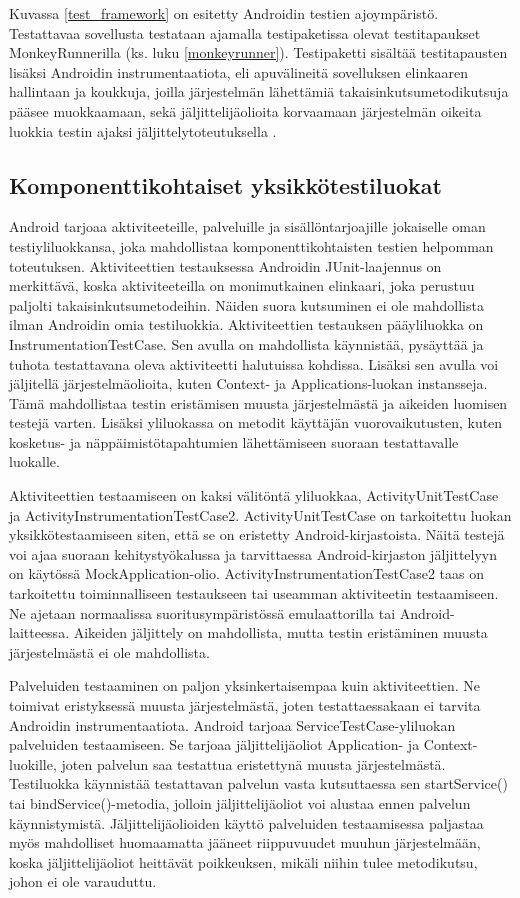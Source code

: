 Kuvassa \ref{test_framework} on esitetty Androidin testien ajoympäristö. Testattavaa sovellusta testataan ajamalla testipaketissa olevat testitapaukset MonkeyRunnerilla (ks. luku \ref{monkeyrunner}). Testipaketti sisältää testitapausten lisäksi Androidin instrumentaatiota, eli apuvälineitä sovelluksen elinkaaren hallintaan ja koukkuja, joilla järjestelmän lähettämiä takaisinkutsumetodikutsuja pääsee muokkaamaan, sekä jäljittelijäolioita korvaamaan järjestelmän oikeita luokkia testin ajaksi jäljittelytoteutuksella \cite{android}.

\subsection{Komponenttikohtaiset yksikkötestiluokat}

Android tarjoaa aktiviteeteille, palveluille ja sisällöntarjoajille jokaiselle oman testiyliluokkansa, joka mahdollistaa komponenttikohtaisten testien helpomman toteutuksen. Aktiviteettien testauksessa Androidin JUnit-laajennus on merkittävä, koska aktiviteeteilla on monimutkainen elinkaari, joka perustuu paljolti takaisinkutsumetodeihin. Näiden suora kutsuminen ei ole mahdollista ilman Androidin omia testiluokkia. Aktiviteettien testauksen pääyliluokka on InstrumentationTestCase. Sen avulla on mahdollista käynnistää, pysäyttää ja tuhota testattavana oleva aktiviteetti halutuissa kohdissa. Lisäksi sen avulla voi jäljitellä järjestelmäolioita, kuten Context- ja Applications-luokan instansseja. Tämä mahdollistaa testin eristämisen muusta järjestelmästä ja aikeiden luomisen testejä varten. Lisäksi yliluokassa on metodit käyttäjän vuorovaikutusten, kuten kosketus- ja näppäimistötapahtumien lähettämiseen suoraan testattavalle luokalle.

Aktiviteettien testaamiseen on kaksi välitöntä yliluokkaa, ActivityUnitTestCase ja ActivityInstrumentationTestCase2. ActivityUnitTestCase on tarkoitettu luokan yksikkötestaamiseen siten, että se on eristetty Android-kirjastoista. Näitä testejä voi ajaa suoraan kehitystyökalussa ja tarvittaessa Android-kirjaston jäljittelyyn on käytössä MockApplication-olio. ActivityInstrumentationTestCase2 taas on tarkoitettu toiminnalliseen testaukseen tai useamman aktiviteetin testaamiseen. Ne ajetaan normaalissa suoritusympäristössä emulaattorilla tai Android-laitteessa. Aikeiden jäljittely on mahdollista, mutta testin eristäminen muusta järjestelmästä ei ole mahdollista.

Palveluiden testaaminen on paljon yksinkertaisempaa kuin aktiviteettien. Ne toimivat eristyksessä muusta järjestelmästä, joten testattaessakaan ei tarvita Androidin instrumentaatiota. Android tarjoaa ServiceTestCase-yliluokan palveluiden testaamiseen. Se tarjoaa jäljittelijäoliot Application- ja Context-luokille, joten palvelun saa testattua eristettynä muusta järjestelmästä. Testiluokka käynnistää testattavan palvelun vasta kutsuttaessa sen startService() tai bindService()-metodia, jolloin jäljittelijäoliot voi alustaa ennen palvelun käynnistymistä. Jäljittelijäolioiden käyttö palveluiden testaamisessa paljastaa myös mahdolliset huomaamatta jääneet riippuvuudet muuhun järjestelmään, koska jäljittelijäoliot heittävät poikkeuksen, mikäli niihin tulee metodikutsu, johon ei ole varauduttu.


